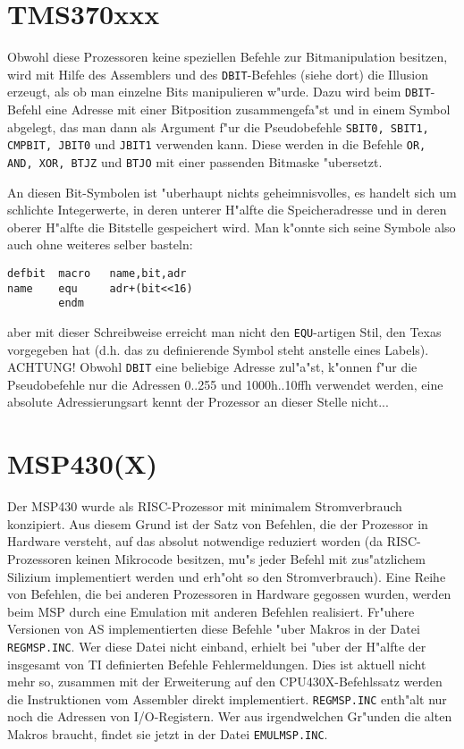 \documentclass[12pt,a4paper,twoside]{report}
\newcommand{\tty}[1]{{\tt #1}}
\begin{document}

\section{TMS370xxx}

Obwohl diese Prozessoren keine speziellen Befehle zur Bitmanipulation
besitzen, wird mit Hilfe des Assemblers und des \tty{DBIT}-Befehles
(siehe dort) die Illusion erzeugt, als ob man einzelne Bits manipulieren
w"urde.  Dazu wird beim \tty{DBIT}-Befehl eine Adresse mit einer
Bitposition zusammengefa"st und in einem Symbol abgelegt, das man dann
als Argument f"ur die Pseudobefehle \tty{SBIT0, SBIT1, CMPBIT, JBIT0}
und \tty{JBIT1} verwenden kann.  Diese werden in die Befehle
\tty{OR, AND, XOR, BTJZ} und \tty{BTJO} mit einer passenden Bitmaske
"ubersetzt.
\par
An diesen Bit-Symbolen ist "uberhaupt nichts geheimnisvolles, es handelt
sich um schlichte Integerwerte, in deren unterer H"alfte die
Speicheradresse und in deren oberer H"alfte die Bitstelle gespeichert
wird.  Man k"onnte sich seine Symbole also auch ohne weiteres selber
basteln:
\begin{verbatim}
defbit  macro   name,bit,adr
name    equ     adr+(bit<<16)
        endm
\end{verbatim}
aber mit dieser Schreibweise erreicht man nicht den \tty{EQU}-artigen Stil,
den Texas vorgegeben hat (d.h. das zu definierende Symbol steht anstelle
eines Labels).  ACHTUNG!  Obwohl \tty{DBIT} eine beliebige Adresse
zul"a"st, k"onnen f"ur die Pseudobefehle nur die Adressen 0..255 und
1000h..10ffh verwendet werden, eine absolute Adressierungsart kennt
der Prozessor an dieser Stelle nicht...


\section{MSP430(X)}
\label{MSPSpec}

Der MSP430 wurde als RISC-Prozessor mit minimalem Stromverbrauch
konzipiert.  Aus diesem Grund ist der Satz von Befehlen, die der
Prozessor in Hardware versteht, auf das absolut notwendige reduziert
worden (da RISC-Prozessoren keinen Mikrocode besitzen, mu"s jeder
Befehl mit zus"atzlichem Silizium implementiert werden und erh"oht so
den Stromverbrauch).  Eine Reihe von Befehlen, die bei anderen
Prozessoren in Hardware gegossen wurden, werden beim MSP durch eine
Emulation mit anderen Befehlen realisiert.  Fr"uhere Versionen
von AS implementierten diese Befehle "uber Makros in der Datei
\tty{REGMSP.INC}.  Wer diese Datei nicht einband, erhielt bei "uber
der H"alfte der insgesamt von TI definierten Befehle
Fehlermeldungen.  Dies ist aktuell nicht mehr so, zusammen mit
der Erweiterung auf den CPU430X-Befehlssatz werden die
Instruktionen vom Assembler direkt implementiert.
\tty{REGMSP.INC} enth"alt nur noch die Adressen von I/O-Registern.
Wer aus irgendwelchen Gr"unden die alten Makros braucht, findet
sie jetzt in der Datei \tty{EMULMSP.INC}.
\end{document}
